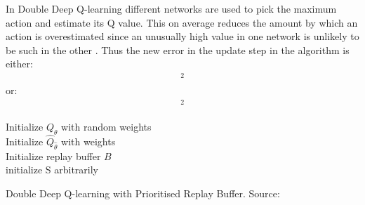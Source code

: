 In Double Deep Q-learning different networks are used to pick the maximum action and estimate its Q value. This on average reduces the amount by which an action is overestimated since an unusually high value in one network is unlikely to be such in the other \cite{lecture_dqn}. Thus the new error in the update step in the algorithm is either:
\begin{align}
    [R + \gamma Q_{\theta}(S', \text{arg}\max_a\ \hat{Q}_{\hat{\theta}}(S', a)) - Q_{\theta}(S, A)]^2
\end{align}
or:
\begin{align}
    [R + \gamma \hat{Q}_{\hat{\theta}}(S', \text{arg}\max_a\ Q_{\theta}(S', a)) - Q_{\theta}(S, A)]^2
\end{align}

\begin{algorithm}[H]
\SetAlgoLined
Initialize $Q_{\theta}$ with random weights \theta \; \\
Initialize $\hat{Q}_{\hat{\theta}}$ with weights \theta \; \\
Initialize replay buffer $B$\; \\
initialize S arbitrarily\;\\
\caption{Double Deep Q-learning with Prioritised Replay Buffer. Source: \cite{lecture_dqn} }
\end{algorithm}\\



